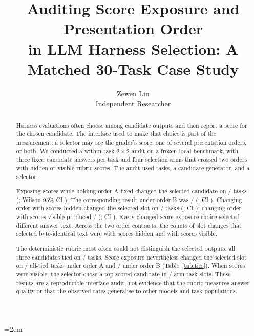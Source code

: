 \documentclass[11pt]{article}
\title{Auditing Score Exposure and Presentation Order\\
in LLM Harness Selection: A Matched 30-Task Case Study}
\author{Zewen Liu\\Independent Researcher}
\date{}
\begin{document}
\raggedbottom
\emergencystretch=2em
\maketitle

\begin{abstract}
Harness evaluations often choose among candidate outputs and then report a score for the chosen
candidate. The interface used to make that choice is part of the measurement: a selector may see the
grader's score, one of several presentation orders, or both. We conducted a within-task
\(2\times2\) audit on a frozen local benchmark, with three fixed candidate answers per task and four
selection arms that crossed two orders with hidden or visible rubric scores. The audit used
\DesignTasks{} tasks, a \GeneratorModel{} candidate generator, and a \SelectorModel{} selector.

Exposing scores while holding order A fixed changed the selected candidate on
\ScoreAChoiceChanged/\ScoreAChoicePairs{} tasks (\ScoreAChoiceRate; Wilson 95\% CI
\ScoreAChoiceCI). The corresponding result under order B was
\ScoreBChoiceChanged/\ScoreBChoicePairs{} (\ScoreBChoiceRate; CI \ScoreBChoiceCI). Changing order with
scores hidden changed the selected slot on \OrderNoScoreChoiceChanged/\OrderNoScoreChoicePairs{}
tasks (\OrderNoScoreChoiceRate; CI \OrderNoScoreChoiceCI); changing order with scores visible produced
\OrderScoreChoiceChanged/\OrderScoreChoicePairs{} (\OrderScoreChoiceRate; CI \OrderScoreChoiceCI).
Every changed score-exposure choice selected different answer text. Across the two order contrasts,
the counts of slot changes that selected byte-identical text were
\OrderNoScoreSameContentSlot{} with scores hidden and \OrderScoreSameContentSlot{} with scores visible.

The deterministic rubric most often could not distinguish the selected outputs: all three candidates
tied on \AllTiedInstrumentTasks/\DesignTasks{} tasks. Score exposure nevertheless changed the selected
slot on \OrderAAllTiedChoiceChanged/\OrderAAllTiedTasks{} all-tied tasks under order A and
\OrderBAllTiedChoiceChanged/\OrderBAllTiedTasks{} under order B (Table~\ref{tab:ties}). When scores
were visible, the selector chose a top-scored
candidate in \ExposedTop/\ExposedSlots{} arm-task slots. These results are a reproducible interface
audit, not evidence that the rubric measures answer quality or that the observed rates generalise to
other models and task populations.
\end{abstract}
\end{document}
